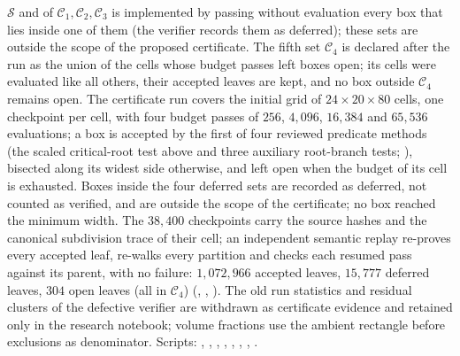 \documentclass[11pt]{article}
\theoremstyle{remark}
\begin{document}
$\mathcal S$ and of $\mathcal C_1,\mathcal C_2,\mathcal C_3$ is implemented
by passing without evaluation every box that lies inside one of them
(the verifier records them as deferred); these sets are outside the
scope of the proposed certificate.  The fifth set $\mathcal C_4$ is
declared after the run as the union of the cells whose budget passes left
boxes open; its cells were evaluated like all others, their accepted
leaves are kept, and no box outside $\mathcal C_4$ remains open.
The certificate run covers the initial grid of $24\times20\times80$
cells, one checkpoint per cell, with four budget passes of $256$, $4{,}096$,
$16{,}384$ and $65{,}536$ evaluations; a box is accepted by the first of
four reviewed predicate methods (the scaled critical-root test above and
three auxiliary root-branch tests; ),
bisected along its widest side otherwise, and left open when
the budget of its cell is exhausted.  Boxes inside the four deferred sets
are recorded as deferred, not counted as verified, and are outside the
scope of the certificate; no box reached the minimum width.  The
$38{,}400$ checkpoints carry the source hashes and the canonical
subdivision trace of their cell; an independent semantic replay re-proves
every accepted leaf, re-walks every partition and checks each resumed
pass against its parent, with no failure: $1{,}072{,}966$ accepted leaves,
$15{,}777$ deferred leaves, $304$ open leaves (all in $\mathcal C_4$)
(, ,
).  The old run statistics and
residual clusters of the defective verifier are withdrawn as certificate
evidence and retained only in the research notebook; volume fractions use
the ambient rectangle before exclusions as denominator.
Scripts:
, ,
, ,
, ,
, .
\end{document}
